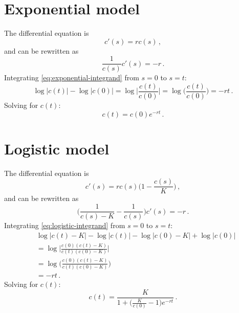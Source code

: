 \documentclass[12pt]{article}
\begin{document}
\setlength{\parskip}{3mm}
\setlength{\parindent}{7mm}

\section{Exponential model}

The differential equation is
%
\begin{equation}
  c'(s) = r c(s)\,,
\end{equation}
%
and can be rewritten as
%
\begin{equation}
  \label{eq:exponential-integrand}
  \frac{1}{c(s)} c'(s) = -r\,.
\end{equation}
%
Integrating \eqref{eq:exponential-integrand} from $s = 0$ to $s = t$:
%
\begin{equation}
  \log|c(t)| - \log|c(0)|
  = \log\bigg|\frac{c(t)}{c(0)}\bigg|
  = \log\bigg(\frac{c(t)}{c(0)}\bigg)
  = -rt\,.
\end{equation}
%
Solving for $c(t)$:
%
\begin{equation}
  \label{eq:exponential}
  c(t) = c(0) e^{-r t}\,.
\end{equation}


\section{Logistic model}

The differential equation is
%
\begin{equation}
  c'(s) = r c(s) \bigg(1 - \frac{c(s)}{K}\bigg)\,,
\end{equation}
%
and can be rewritten as
%
\begin{equation}
  \label{eq:logistic-integrand}
  \bigg(\frac{1}{c(s) - K} - \frac{1}{c(s)}\bigg) c'(s) = -r\,.
\end{equation}
%
Integrating \eqref{eq:logistic-integrand} from $s = 0$ to $s = t$:
%
\begin{equation}
  \begin{aligned}
    &\log|c(t) - K| - \log|c(t)| - \log|c(0) - K| + \log|c(0)| \\
    &= \log\bigg|\frac{c(0) (c(t) - K)}{c(t) (c(0) - K)}\bigg| \\
    &= \log\bigg(\frac{c(0) (c(t) - K)}{c(t) (c(0) - K)}\bigg) \\
    &= -rt\,.
  \end{aligned}
\end{equation}
%
Solving for $c(t)$:
%
\begin{equation}
  \label{eq:logistic}
  c(t) = \frac{K}{1 + \big(\frac{K}{c(0)} - 1\big) e^{-r t}}\,.
\end{equation}
\end{document}
